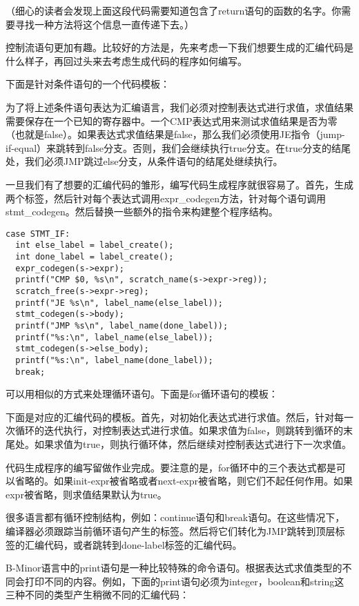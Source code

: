 \documentclass[cn,11pt,chinese]{elegantbook}
\begin{document}
（细心的读者会发现上面这段代码需要知道包含了return语句的函数的名字。你需要寻找一种方法将这个信息一直传递下去。）

控制流语句更加有趣。比较好的方法是，先来考虑一下我们想要生成的汇编代码是什么样子，再回过头来去考虑生成代码的程序如何编写。

下面是针对条件语句的一个代码模板：

为了将上述条件语句表达为汇编语言，我们必须对控制表达式进行求值，求值结果需要保存在一个已知的寄存器中。一个CMP表达式用来测试求值结果是否为零（也就是false）。如果表达式求值结果是false，那么我们必须使用JE指令（jump-if-equal）来跳转到false分支。否则，我们会继续执行true分支。在true分支的结尾处，我们必须JMP跳过else分支，从条件语句的结尾处继续执行。

一旦我们有了想要的汇编代码的雏形，编写代码生成程序就很容易了。首先，生成两个标签，然后针对每个表达式调用expr\_codegen方法，针对每个语句调用stmt\_codegen。然后替换一些额外的指令来构建整个程序结构。

\begin{verbatim}
case STMT_IF:
  int else_label = label_create();
  int done_label = label_create();
  expr_codegen(s->expr);
  printf("CMP $0, %s\n", scratch_name(s->expr->reg));
  scratch_free(s->expr->reg);
  printf("JE %s\n", label_name(else_label));
  stmt_codegen(s->body);
  printf("JMP %s\n", label_name(done_label));
  printf("%s:\n", label_name(else_label));
  stmt_codegen(s->else_body);
  printf("%s:\n", label_name(done_label));
  break;
\end{verbatim}

可以用相似的方式来处理循环语句。下面是for循环语句的模板：

下面是对应的汇编代码的模板。首先，对初始化表达式进行求值。然后，针对每一次循环的迭代执行，对控制表达式进行求值。如果求值为false，则跳转到循环的末尾处。如果求值为true，则执行循环体，然后继续对控制表达式进行下一次求值。

代码生成程序的编写留做作业完成。要注意的是，for循环中的三个表达式都是可以省略的。如果init-expr被省略或者next-expr被省略，则它们不起任何作用。如果expr被省略，则求值结果默认为true。

很多语言都有循环控制结构，例如：continue语句和break语句。在这些情况下，编译器必须跟踪当前循环语句产生的标签。然后将它们转化为JMP跳转到顶层标签的汇编代码，或者跳转到done-label标签的汇编代码。

B-Minor语言中的print语句是一种比较特殊的命令语句。根据表达式求值类型的不同会打印不同的内容。例如，下面的print语句必须为integer，boolean和string这三种不同的类型产生稍微不同的汇编代码：
\end{document}
